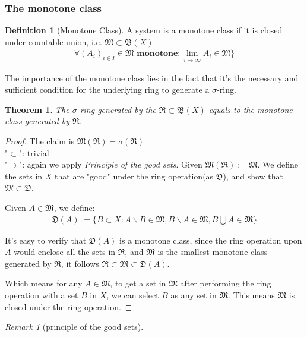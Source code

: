 \documentclass[a4paper,11pt,oneside,fleqn]{book}
\newtheorem{theorem}{Theorem}[section]
\theoremstyle{definition}
\newtheorem{definition}{Definition}[section]
\theoremstyle{remark}
\newtheorem*{remark}{Remark}
\begin{document}
\subsubsection*{The monotone class}
\begin{definition}[Monotone Class]
	A system is a monotone class if it is closed under countable union, i.e. $\mathfrak{M} \subset \mathfrak{B}(X)$
	\begin{align*}
		\forall (A_i)_{i \in I} \in \mathfrak{M} \textbf{ monotone}: \lim_{i\rightarrow \infty} A_i \in \mathfrak{M} \}
	\end{align*}
\end{definition}
The importance of the monotone class lies in the fact that it's the necessary and sufficient condition for the underlying ring to generate a $\sigma$-ring.

\begin{theorem}
	The $\sigma$-ring generated by the $\mathfrak{R} \subset \mathfrak{B}(X)$ equals to the monotone class generated by $\mathfrak{R}$.
\end{theorem}
\begin{proof}
	The claim is $\mathfrak{M}(\mathfrak{R}) = \sigma(\mathfrak{R})$\\
	"$\subset$": trivial \\
	"$\supset$": again we apply \textit{Principle of the good sets}. Given $\mathfrak{M}(\mathfrak{R}):= \mathfrak{M}$. We define the sets in $X$ that are "good" under the ring operation(as $\mathfrak{D}$), and show that $\mathfrak{M} \subset \mathfrak{D} $.\par 
	Given $A \in \mathfrak{M}$, we define:
	\begin{align*}
		\mathfrak{D}(A):= \{ B \subset X: A \backslash B \in \mathfrak{M}, B \backslash A \in \mathfrak{M}, B \bigcup A \in \mathfrak{M} \}
	\end{align*}
	
It's easy to verify that $\mathfrak{D}(A)$ is a monotone class, since the ring operation upon $A$ would enclose all the sets in $\mathfrak{R}$, and $\mathfrak{M}$ is the smallest monotone class generated by $\mathfrak{R}$, it follows $\mathfrak{R}  \subset \mathfrak{M} \subset \mathfrak{D}(A)$.\par
Which means for any $A \in \mathfrak{M}$, to get a set in $\mathfrak{M}$ after performing the ring operation with a set $B$ in $X$, we can select $B$ as any set in $\mathfrak{M}$. This means $\mathfrak{M}$ is closed under the ring operation. 
\end{proof}
\begin{remark}[principle of the good sets]
\end{remark}
\end{document}
